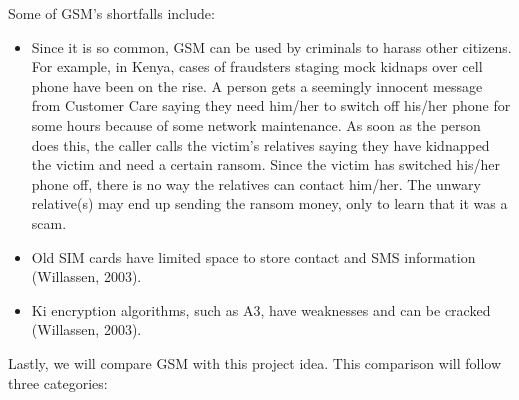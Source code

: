 \documentclass[12pt,svgnames,smaller]{article} %
\begin{document}
	Some of GSM’s shortfalls include:

	\begin{itemize}
		\item Since it is so common, GSM can be used by criminals to harass other citizens. For example, in Kenya, cases of fraudsters staging mock kidnaps over cell phone have been on the rise. A person gets a seemingly innocent message from Customer Care saying they need him/her to switch off his/her phone for some hours because of some network maintenance. As soon as the person does this, the caller calls the victim’s relatives saying they have kidnapped the victim and need a certain ransom. Since the victim has switched his/her phone off, there is no way the relatives can contact him/her. The unwary relative(s) may end up sending the ransom money, only to learn that it was a scam.
		\item Old SIM cards have limited space to store contact and SMS information (Willassen, 2003).
		\item Ki encryption algorithms, such as A3, have weaknesses and can be cracked (Willassen, 2003). 
	\end{itemize}

	Lastly, we will compare GSM with this project idea. This comparison will follow three categories: 
	
\end{document}
